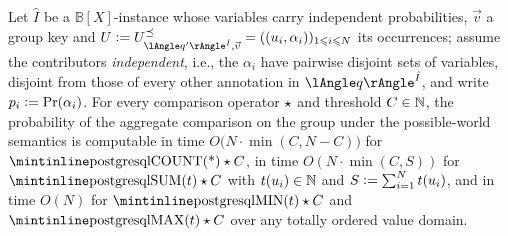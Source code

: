 \begin{propositionrep}
\label{prop:agg-cmp-poly-prob}
Let $\hat I$ be a $\mathbb{B}[X]$-instance whose variables carry
independent probabilities, $\vec v$ a group key and
$U\defeq U^{\preceq}_{\angsem{\hat I}{q'},\vec v}=((u_i,\alpha_i))_{1\le i\le N}$
its occurrences; assume the contributors \emph{independent}, i.e., the
$\alpha_i$ have pairwise disjoint sets of variables, disjoint from those
of every other annotation in $\angsem{\hat I}{q}$, and write
$p_i\mathrel{\mathop:}=\Pr(\alpha_i)$. For every comparison operator $\mathbin{\mathsf{\star}}$ and
threshold $C\in\mathbb{N}$, the probability of the aggregate comparison on the
group under the possible-world semantics is computable in time
$O\bigl(N\cdot\min(C,N-C)\bigr)$ for $\text{\sql{COUNT(*)}}\op C$, in
time $O(N\cdot\min(C,S))$ for $\text{\sql{SUM}}(t)\op C$ with
$t(u_i)\in\mathbb{N}$ and $S\mathrel{\mathop:}=\sum_{i=1}^N t(u_i)$, and in time $O(N)$ for
$\text{\sql{MIN}}(t)\op C$ and $\text{\sql{MAX}}(t)\op C$ over any
totally ordered value domain.
\end{propositionrep}

